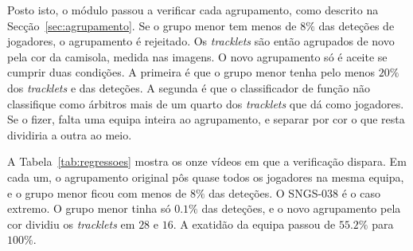 Posto isto, o módulo passou a verificar cada agrupamento, como descrito na Secção~\ref{sec:agrupamento}. Se o grupo menor tem menos de $8\%$ das deteções de jogadores, o agrupamento é rejeitado. Os \emph{tracklets} são então agrupados de novo pela cor da camisola, medida nas imagens. O novo agrupamento só é aceite se cumprir duas condições. A primeira é que o grupo menor tenha pelo menos $20\%$ dos \emph{tracklets} e das deteções. A segunda é que o classificador de função não classifique como árbitros mais de um quarto dos \emph{tracklets} que dá como jogadores. Se o fizer, falta uma equipa inteira ao agrupamento, e separar por cor o que resta dividiria a outra ao meio.

A Tabela~\ref{tab:regressoes} mostra os onze vídeos em que a verificação dispara. Em cada um, o agrupamento original pôs quase todos os jogadores na mesma equipa, e o grupo menor ficou com menos de $8\%$ das deteções. O SNGS-038 é o caso extremo. O grupo menor tinha só $0.1\%$ das deteções, e o novo agrupamento pela cor dividiu os \emph{tracklets} em $28$ e $16$. A exatidão da equipa passou de $55.2\%$ para $100\%$.

